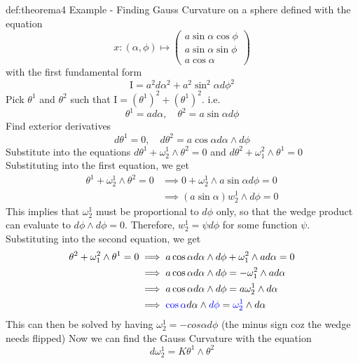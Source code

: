 \documentclass[landscape, 8pt]{extarticle}
\begin{document}
\begin{multicols}{3}
\begin{xmp}{def:theorema}{4}
    Example - Finding Gauss Curvature on a sphere defined with the equation
    \[x:(\alpha, \phi)\mapsto \begin{pmatrix}
        a\sin\alpha \cos\phi \\
        a\sin\alpha \sin\phi \\
        a\cos\alpha
    \end{pmatrix}\]
    with the first fundamental form
    \[\mathrm{I} = a^{2}d\alpha^{2} + a^{2}\sin^{2}\alpha d\phi^{2}\]
    Pick \(\theta^{1}\) and \(\theta^{2}\) such that \(\mathrm{I} = (\theta^{1})^{2} + (\theta^{1})^{2}\). i.e.
    \[\theta^{1} = ad\alpha,\quad \theta^{2} = a\sin\alpha d\phi\]
    Find exterior derivatives
    \[d\theta^{1} = 0 , \quad d\theta^{2} = a\cos\alpha d\alpha\wedge d\phi\]
    Substitute into the equations \(d\theta^{1} + \omega^{1}_{2}\wedge \theta^{2} = 0\) and \(d\theta^{2} + \omega^{2}_{1}\wedge \theta^{1} = 0\)
    Substituting into the first equation, we get
    \begin{align*}
        \theta^{1} + \omega^{1}_{2}\wedge \theta^{2} = 0 &\implies 0 + \omega^{1}_{2}\wedge a\sin\alpha d\phi = 0 \\
        &\implies (a\sin\alpha) w^{1}_{2} \wedge d\phi = 0
    \end{align*}
    This implies that \(\omega^{1}_{2}\) must be proportional to \(d\phi\) only, so that the wedge product can evaluate to \(d\phi \wedge d\phi = 0\). Therefore, \(w^{1}_{2} = \psi d\phi\) for some function \(\psi\). Substituting into the second equation, we get
    \begin{align*}
        \theta^{2} + \omega^{2}_{1}\wedge \theta^{1} = 0 &\implies a\cos\alpha d\alpha\wedge d\phi + \omega^{2}_{1}\wedge ad\alpha = 0 \\
        &\implies a\cos\alpha d\alpha\wedge d\phi = -\omega^{2}_{1}\wedge ad\alpha \\
        &\implies a\cos\alpha d\alpha\wedge d\phi = a\omega^{1}_{2}\wedge d\alpha \\
        &\implies \textcolor{blue}{\cos\alpha} d\alpha\wedge \textcolor{blue}{d\phi} = \textcolor{blue}{\omega^{1}_{2}}\wedge d\alpha \\
    \end{align*}
    This can then be solved by having \(\omega^{1}_{2} = -cos\alpha d\phi\) (the minus sign coz the wedge needs flipped)
    Now we can find the Gauss Curvature with the equation
    \[d\omega^{1}_{2} = K\theta^{1}\wedge \theta^{2}\]

\end{xmp}
\end{multicols}
\end{document}
